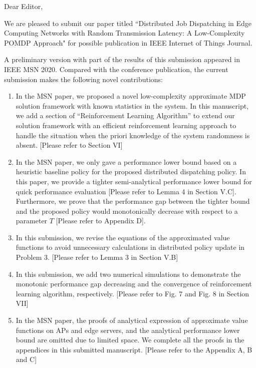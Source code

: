\documentclass[10pt,draftclsnofoot,onecolumn]{article}
\begin{document}
Dear Editor,

We are pleased to submit our paper titled ``Distributed Job Dispatching in Edge Computing Networks with Random Transmission Latency: A Low-Complexity POMDP Approach" for possible publication in IEEE Internet of Things Journal.

A preliminary version with part of the results of this submission appeared in IEEE MSN 2020.
Compared with the conference publication, the current submission makes the following novel contributions:
\begin{enumerate}
\item In the MSN paper, we proposed a novel low-complexity approximate MDP solution framework with known statistics in the system.
In this manuscript, we add a section of ``Reinforcement Learning Algorithm'' to extend our solution framework with an efficient reinforcement learning approach to handle the situation when the priori knowledge of the system randomness is absent. [Please refer to Section VI]

\item In the MSN paper, we only gave a performance lower bound based on a heuristic baseline policy for the proposed distributed dispatching policy. In this paper, we provide a tighter semi-analytical performance lower bound for quick performance evaluation [Please refer to Lemma 4 in Section V.C]. 
Furthermore, we prove that the performance gap between the tighter bound and the proposed policy would monotonically decrease with respect to a parameter $T$ [Please refer to Appendix D]. 

\item In this submission, we revise the equations of the approximated value functions to avoid unnecessary calculations in distributed policy update in Problem 3. [Please refer to Lemma 3 in Section V.B]

\item In this submission, we add two numerical simulations to demonstrate the monotonic performance gap decreasing and the convergence of reinforcement learning algorithm, respectively. [Please refer to Fig. 7 and Fig. 8 in Section VII]

\item In the MSN paper, the proofs of analytical expression of approximate value functions on APs and edge servers, and the analytical performance lower bound are omitted due to limited space. We complete all the proofs in the appendices in this submitted manuscript. [Please refer to the Appendix A, B and C]


\end{enumerate}
\end{document}
